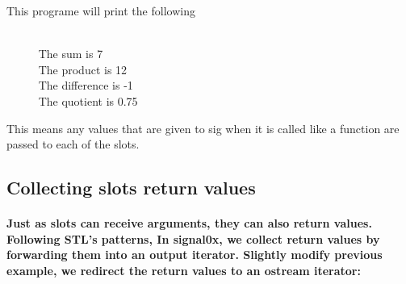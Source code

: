 \documentclass[9pt,onside,a4paper]{article}
\newcommand{\hllin}[1]{\textcolor[rgb]{0.6,0.6,0.6}{#1}}
\begin{document}
This programe will print the following  
\begin{shaded}
{\small
\ttfamily
~\\
\hllin{\ \ \ \ \ }         The sum is 7 \\
\hllin{\ \ \ \ \ }         The product is 12 \\ 
\hllin{\ \ \ \ \ }         The difference is -1 \\
\hllin{\ \ \ \ \ }         The quotient is 0.75 \\
\normalfont
}
\end{shaded}

This means any values that are given to sig when it is called like a function are passed to each of the slots.

\subsection{Collecting slots return values}

\paragraph{Just as slots can receive arguments, they can also return values. Following STL's patterns, In signal0x, we collect return
    values by forwarding them into an output iterator. Slightly modify previous example, we redirect the return values to an ostream iterator:}
\end{document}
